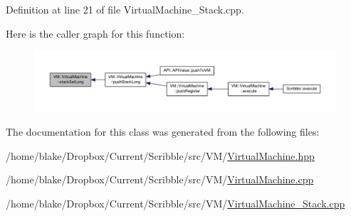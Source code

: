 Definition at line 21 of file Virtual\-Machine\-\_\-\-Stack.\-cpp.



Here is the caller graph for this function\-:
\nopagebreak
\begin{figure}[H]
\begin{center}
\leavevmode
\includegraphics[width=350pt]{class_v_m_1_1_virtual_machine_a59e82138e4b6ffcaa63ba24948e463fb_icgraph}
\end{center}
\end{figure}




The documentation for this class was generated from the following files\-:\begin{DoxyCompactItemize}
\item 
/home/blake/\-Dropbox/\-Current/\-Scribble/src/\-V\-M/\hyperlink{_virtual_machine_8hpp}{Virtual\-Machine.\-hpp}\item 
/home/blake/\-Dropbox/\-Current/\-Scribble/src/\-V\-M/\hyperlink{_virtual_machine_8cpp}{Virtual\-Machine.\-cpp}\item 
/home/blake/\-Dropbox/\-Current/\-Scribble/src/\-V\-M/\hyperlink{_virtual_machine___stack_8cpp}{Virtual\-Machine\-\_\-\-Stack.\-cpp}\end{DoxyCompactItemize}

